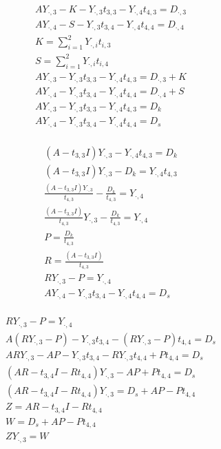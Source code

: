 \documentclass[]{article}
\begin{document}
\begin{gather}
AY_{\cdot,3} - K - Y_{\cdot,3}t_{3,3} - Y_{\cdot,4}t_{4,3} = D_{\cdot,3}\\
AY_{\cdot,4} - S - Y_{\cdot,3}t_{3,4} - Y_{\cdot,4}t_{4,4} = D_{\cdot,4}\\
K=\sum_{i=1}^{2} Y_{\cdot,i}t_{i,3}\\
S=\sum_{i=1}^{2} Y_{\cdot,i}t_{i,4}\\
AY_{\cdot,3}  - Y_{\cdot,3}t_{3,3} - Y_{\cdot,4}t_{4,3} = D_{\cdot,3} + K\\
AY_{\cdot,4}  - Y_{\cdot,3}t_{3,4} - Y_{\cdot,4}t_{4,4} = D_{\cdot,4} + S \\
AY_{\cdot,3}  - Y_{\cdot,3}t_{3,3} - Y_{\cdot,4}t_{4,3} = D_k\\
AY_{\cdot,4}  - Y_{\cdot,3}t_{3,4} - Y_{\cdot,4}t_{4,4} = D_s \\
\end{gather}

\begin{gather}
(A  - t_{3,3}I)Y_{\cdot,3} - Y_{\cdot,4}t_{4,3} = D_k\\
(A  - t_{3,3}I)Y_{\cdot,3} - D_k= Y_{\cdot,4}t_{4,3} \\
\frac{(A  - t_{3,3}I)Y_{\cdot,3}}{t_{4,3}} - \frac{D_k}{t_{4,3}}= Y_{\cdot,4} \\
\frac{(A  - t_{3,3}I)}{t_{4,3}}Y_{\cdot,3} - \frac{D_k}{t_{4,3}}= Y_{\cdot,4} \\
P = \frac{D_k}{t_{4,3}}\\
R = \frac{(A  - t_{3,3}I)}{t_{4,3}}\\
RY_{\cdot,3} - P = Y_{\cdot,4} \\
AY_{\cdot,4}  - Y_{\cdot,3}t_{3,4} - Y_{\cdot,4}t_{4,4} = D_s \\
\end{gather}

\begin{gather}
RY_{\cdot,3} - P = Y_{\cdot,4} \\
A(RY_{\cdot,3} - P)  - Y_{\cdot,3}t_{3,4} - (RY_{\cdot,3} - P)t_{4,4} = D_s \\
ARY_{\cdot,3} - AP  - Y_{\cdot,3}t_{3,4} - RY_{\cdot,3}t_{4,4} + Pt_{4,4} = D_s \\
(AR - t_{3,4}I - Rt_{4,4})Y_{\cdot,3} - AP  + Pt_{4,4} = D_s \\
(AR - t_{3,4}I - Rt_{4,4})Y_{\cdot,3} = D_s  + AP  - Pt_{4,4}\\
Z = AR - t_{3,4}I - Rt_{4,4}\\
W= D_s  + AP  - Pt_{4,4}\\
ZY_{\cdot,3} = W\\
\end{gather}
\end{document}
